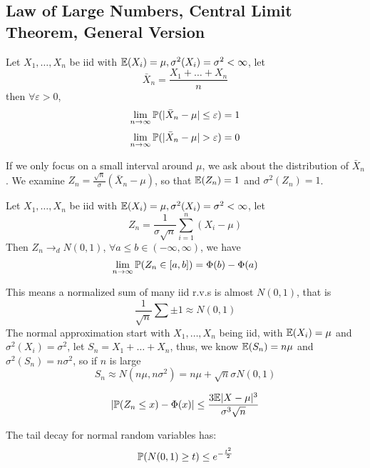 \subsection{Law of Large Numbers, Central Limit Theorem, General Version}
\begin{theorem}
    Let $X_1, \dots, X_n$ be iid with $\mathbb{E}(X_i) = \mu, \sigma^2(X_i) = \sigma^2 < \infty$, let
    $$\bar{X}_n = \frac{X_1 + \dots + X_n}{n}$$
    then $\forall \varepsilon > 0$,
    $$\lim_{n \to \infty} \mathbb{P}(|\bar{X}_n - \mu| \le \varepsilon) = 1$$
    $$\lim_{n \to \infty} \mathbb{P}(|\bar{X}_n - \mu| > \varepsilon) = 0$$
\end{theorem}
If we only focus on a small interval around $\mu$, we ask about the distribution of $\bar{X}_n$. We examine $Z_n = \frac{\sqrt{n}}{\sigma}(\bar{X}_n - \mu)$, so that $\mathbb{E}(Z_n) = 1$ and $\sigma^2(Z_n) = 1$.
\begin{theorem}
    Let $X_1, \dots, X_n$ be iid with $\mathbb{E}(X_i) = \mu, \sigma^2(X_i) = \sigma^2 < \infty$, let
    $$Z_n = \frac{1}{\sigma \sqrt{n}} \sum_{i = 1}^{n} (X_i - \mu)$$
    Then $Z_n \to_d N(0, 1)$, $\forall a \le b \in (-\infty, \infty)$, we have
    $$\lim_{n \to \infty} \mathbb{P}(Z_n \in [a, b]) = \Phi(b) - \Phi(a)$$
\end{theorem}
This means a normalized sum of many iid r.v.s is almost $N(0, 1)$, that is
$$\frac{1}{\sqrt{n}} \sum \pm 1 \approx N(0, 1)$$
The normal approximation start with $X_1, \dots, X_n$ being iid, with $\mathbb{E}(X_i) = \mu$ and $\sigma^2(X_i) = \sigma^2$, let $S_n = X_1 + \dots + X_n$, thus, we know $\mathbb{E}(S_n) = n\mu$ and $\sigma^2(S_n) = n\sigma^2$, so if $n$ is large
$$S_n \approx N(n\mu, n\sigma^2) = n \mu + \sqrt{n}\sigma N(0, 1)$$
\begin{theorem}
    $$|\mathbb{P}(Z_n \le x) - \Phi(x)| \le \frac{3\mathbb{E}|X - \mu|^3}{\sigma^3 \sqrt{n}}$$
\end{theorem}
The tail decay for normal random variables has:
$$\mathbb{P}(N(0, 1) \ge t) \le e^{-\frac{t^2}{2}}$$

\newpage